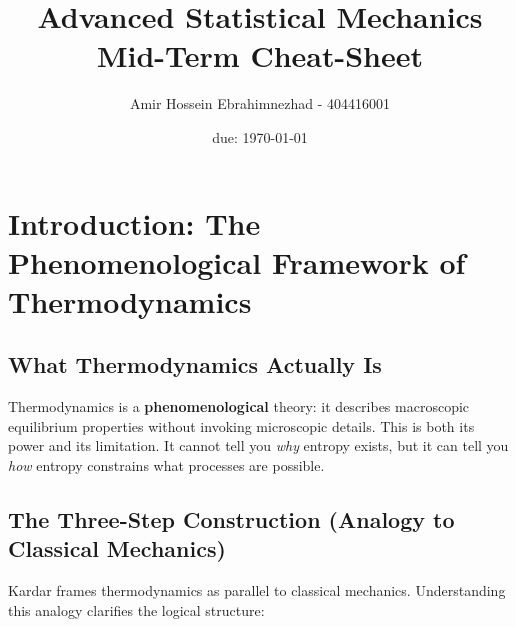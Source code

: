 \documentclass[9pt,twocoloumn]{article}
\title{Advanced Statistical Mechanics Mid-Term Cheat-Sheet}
\author{Amir Hossein Ebrahimnezhad - 404416001}
\date{due: \today}
\begin{document}
\maketitle
\section{Introduction: The Phenomenological Framework of Thermodynamics}

\subsection{What Thermodynamics Actually Is}
Thermodynamics is a \textbf{phenomenological} theory: it describes macroscopic equilibrium properties without invoking microscopic details. This is both its power and its limitation. It cannot tell you \emph{why} entropy exists, but it can tell you \emph{how} entropy constrains what processes are possible.

\subsection{The Three-Step Construction (Analogy to Classical Mechanics)}
Kardar frames thermodynamics as parallel to classical mechanics. Understanding this analogy clarifies the logical structure:
\end{document}
